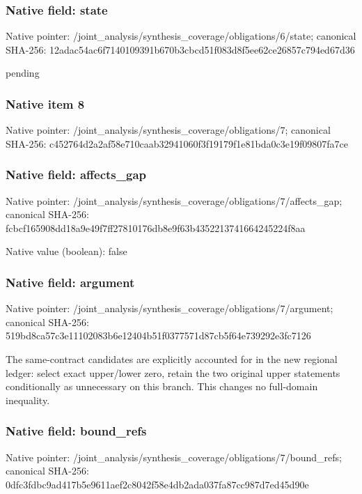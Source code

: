 \documentclass[10pt,a4paper]{article}
\begin{document}
\subsubsection{Native field: state}
Native pointer: /joint\_\allowbreak{}analysis/synthesis\_\allowbreak{}coverage/obligations/6/state; canonical SHA-256: 12adac54ac6f7140109391b670b3cbcd51f083d8f5ee62ce26857c794ed67d36

\begingroup\raggedright\sloppy pending\par\endgroup

\subsubsection{Native item 8}
Native pointer: /joint\_\allowbreak{}analysis/synthesis\_\allowbreak{}coverage/obligations/7; canonical SHA-256: c452764d2a2af58e710caab32941060f3f19179f1e81bda0c3e19f09807fa7ce

\subsubsection{Native field: affects\_\allowbreak{}gap}
Native pointer: /joint\_\allowbreak{}analysis/synthesis\_\allowbreak{}coverage/obligations/7/affects\_\allowbreak{}gap; canonical SHA-256: fcbcf165908dd18a9e49f7ff27810176db8e9f63b4352213741664245224f8aa

Native value (boolean): false

\subsubsection{Native field: argument}
Native pointer: /joint\_\allowbreak{}analysis/synthesis\_\allowbreak{}coverage/obligations/7/argument; canonical SHA-256: 519bd8ca57c3e11102083b6e12404b51f0377571d87cb5f64e739292e3fc7126

\begingroup\raggedright\sloppy The same-contract candidates are explicitly accounted for in the new regional ledger:\allowbreak{} select exact upper/\allowbreak{}lower zero,\allowbreak{} retain the two original upper statements conditionally as unnecessary on this branch. This changes no full-domain inequality.\par\endgroup

\subsubsection{Native field: bound\_\allowbreak{}refs}
Native pointer: /joint\_\allowbreak{}analysis/synthesis\_\allowbreak{}coverage/obligations/7/bound\_\allowbreak{}refs; canonical SHA-256: 0dfc3fdbc9ad417b5e9611aef2c8042f58e4db2ada037fa87cc987d7ed45d90e
\end{document}
